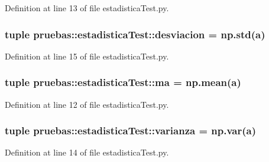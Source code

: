 \-Definition at line 13 of file estadistica\-Test.\-py.

\subsubsection[{desviacion}]{\setlength{\rightskip}{0pt plus 5cm}tuple {\bf pruebas\-::estadistica\-Test\-::desviacion} = np.\-std({\bf a})}\label{namespacepruebas_1_1estadistica_test_ad432de748d732488d79ac5354cf98be8}


\-Definition at line 15 of file estadistica\-Test.\-py.

\subsubsection[{ma}]{\setlength{\rightskip}{0pt plus 5cm}tuple {\bf pruebas\-::estadistica\-Test\-::ma} = np.\-mean({\bf a})}\label{namespacepruebas_1_1estadistica_test_a2b472b6a44ccc0f8ace5fec748c25014}


\-Definition at line 12 of file estadistica\-Test.\-py.

\subsubsection[{varianza}]{\setlength{\rightskip}{0pt plus 5cm}tuple {\bf pruebas\-::estadistica\-Test\-::varianza} = np.\-var({\bf a})}\label{namespacepruebas_1_1estadistica_test_a067d4f0aad62bc1708ad1f8f7a00895a}


\-Definition at line 14 of file estadistica\-Test.\-py.

